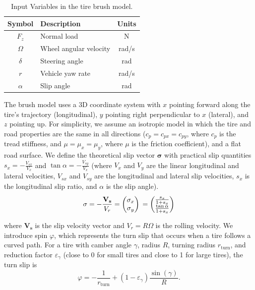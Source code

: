 \documentclass[letterpaper, 10 pt, conference]{ieeeconf}  %
\begin{document}
\begin{table}[h!]
    \caption{Input Variables in the tire brush model.}
    \label{tab:input}
    \vspace{-5pt}
    \centering
    \begin{tabular}{clc}
    \toprule
    \textbf{Symbol} & \textbf{Description} & \textbf{Units} \\
\midrule
        $F_z$ & Normal load & N \\
         $\Omega$ & Wheel angular velocity & rad/s \\
         $\delta$ & Steering angle & rad \\
         $r$ & Vehicle yaw rate & rad/s \\
         $\alpha$ & Slip angle & rad \\   
    \bottomrule
    \end{tabular}
\end{table}
\vspace{-5pt}

The brush model uses a 3D coordinate system with $x$ pointing forward along the tire's trajectory (longitudinal), $y$ pointing right perpendicular to $x$ (lateral), and $z$ pointing up. For simplicity, we assume an isotropic model in which the tire and road properties are the same in all directions ($c_p=c_{px}=c_{py}$, where $c_p$ is the tread stiffness, and $\mu=\mu_x=\mu_y$, where $\mu$ is the friction coefficient), and a flat road surface. We define the theoretical slip vector $\mathbf{\sigma}$ with practical slip quantities $s_x=-\frac{V_{sx}}{V_x}$ and $\tan \alpha = -\frac{V_{sy}}{V_x}$ (where $V_x$ and $V_y$ are the linear longitudinal and lateral velocities, $V_{sx}$ and $V_{sy}$ are the longitudinal and lateral slip velocities, $s_x$ is the longitudinal slip ratio, and $\alpha$ is the slip angle).
\begin{equation}
    \mathbf{\sigma} 
    = -\frac{\mathbf{V_s}}{V_r}
    = \begin{pmatrix}
        \sigma_x \\
        \sigma_y
    \end{pmatrix} \\
    = \begin{pmatrix}
        \frac{s_x}{1+s_x} \\
        \frac{\tan \alpha}{1+s_x}
    \end{pmatrix}
\end{equation}

where $\mathbf{V_s}$ is the slip velocity vector and $V_r=R\Omega$ is the rolling velocity. We introduce spin $\varphi$, which represents the turn slip that occurs when a tire follows a curved path. For a tire with camber angle $\gamma$, radius $R$, turning radius $r_{\text{turn}}$, and reduction factor $\varepsilon_{\gamma}$ (close to 0 for small tires and close to 1 for large tires), the turn slip is
\begin{equation}
    \varphi = -\frac{1}{r_{\text{turn}}} + (1-\varepsilon_\gamma) \frac{\sin(\gamma)}{R}.
\end{equation}
\end{document}
